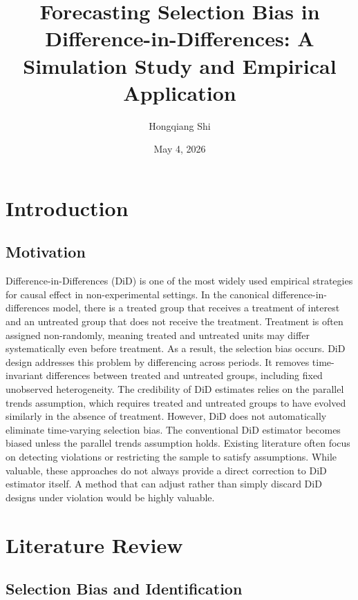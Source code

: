 \documentclass[12pt]{article}
\title{Forecasting Selection Bias in Difference-in-Differences: A Simulation Study and Empirical Application}
\author{Hongqiang Shi}
\date{May 4, 2026}
\begin{document}
\maketitle

\section{Introduction}

\subsection{Motivation}

Difference-in-Differences (DiD) is one of the most widely used empirical strategies for causal effect in non-experimental settings. In the canonical difference-in-differences model, there is a treated group that receives a treatment of interest and an untreated group that does not receive the treatment. Treatment is often assigned non-randomly, meaning treated and untreated units may differ systematically even before treatment. As a result, the selection bias occurs. 
DiD design addresses this problem by differencing across periods. It removes time-invariant differences between treated and untreated groups, including fixed unobserved heterogeneity. 
The credibility of DiD estimates relies on the parallel trends assumption, which requires treated and untreated groups to have evolved similarly in the absence of treatment. However, DiD does not automatically eliminate time-varying selection bias. The conventional DiD estimator becomes biased unless the parallel trends assumption holds. Existing literature often focus on detecting violations or restricting the sample to satisfy assumptions. While valuable, these approaches do not always provide a direct correction to DiD estimator itself. A method that can adjust rather than simply discard DiD designs under violation would be highly valuable.

 
\section{Literature Review}

\subsection{Selection Bias and Identification}
\end{document}

